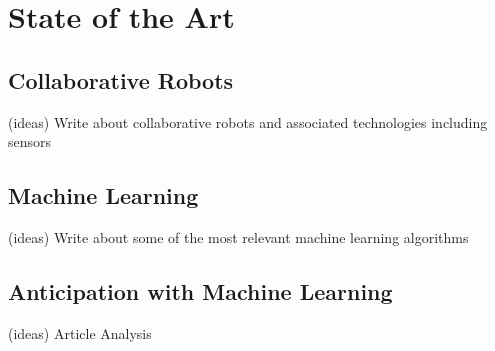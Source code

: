 \chapter{State of the Art}
\label{chapter:state_of_the_art}

\section{Collaborative Robots}

{\color{gray}
(ideas) Write about collaborative robots and associated technologies including sensors
}

\section{Machine Learning}

{\color{gray}
(ideas) Write about some of the most relevant machine learning algorithms
}

\section{Anticipation with Machine Learning}

{\color{gray}
(ideas) Article Analysis
}

\cite{Maeda2016}